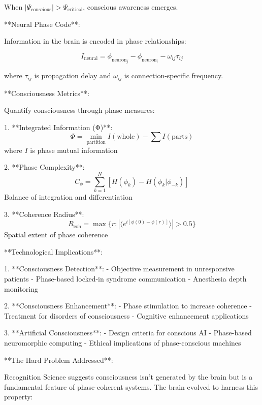 \documentclass[12pt,a4paper]{report}
\begin{document}
When $|\Psi_{\text{conscious}}| > \Psi_{\text{critical}}$, conscious awareness emerges.

**Neural Phase Code**:

Information in the brain is encoded in phase relationships:

\begin{equation}
I_{\text{neural}} = \phi_{\text{neuron}_j} - \phi_{\text{neuron}_i} - \omega_{ij} \tau_{ij}
\end{equation}

where $\tau_{ij}$ is propagation delay and $\omega_{ij}$ is connection-specific frequency.

**Consciousness Metrics**:

Quantify consciousness through phase measures:

1. **Integrated Information (Φ)**:
   \begin{equation}
   \Phi = \min_{\text{partition}} I(\text{whole}) - \sum I(\text{parts})
   \end{equation}
   where $I$ is phase mutual information

2. **Phase Complexity**:
   \begin{equation}
   C_\phi = \sum_{k=1}^{N} \left[H(\phi_k) - H(\phi_k|\phi_{-k})\right]
   \end{equation}
   Balance of integration and differentiation

3. **Coherence Radius**:
   \begin{equation}
   R_{\text{coh}} = \max\{r : |\langle e^{i[\phi(0) - \phi(r)]}\rangle| > 0.5\}
   \end{equation}
   Spatial extent of phase coherence

**Technological Implications**:

1. **Consciousness Detection**:
   - Objective measurement in unresponsive patients
   - Phase-based locked-in syndrome communication
   - Anesthesia depth monitoring

2. **Consciousness Enhancement**:
   - Phase stimulation to increase coherence
   - Treatment for disorders of consciousness
   - Cognitive enhancement applications

3. **Artificial Consciousness**:
   - Design criteria for conscious AI
   - Phase-based neuromorphic computing
   - Ethical implications of phase-conscious machines

**The Hard Problem Addressed**:

Recognition Science suggests consciousness isn't generated by the brain but is a fundamental feature of phase-coherent systems. The brain evolved to harness this property:
\end{document}
